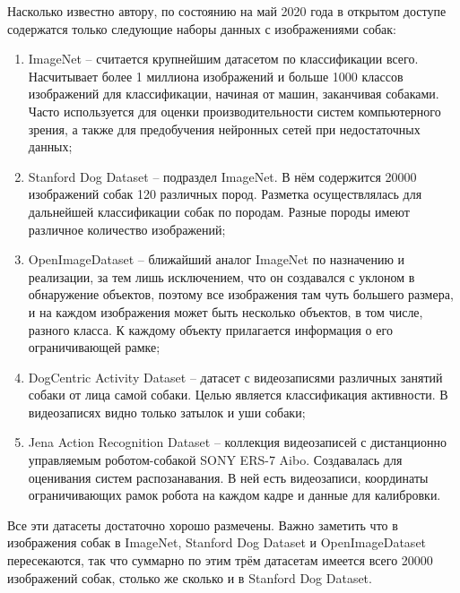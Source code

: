 Насколько известно автору, по состоянию на май 2020 года в открытом доступе содержатся только следующие наборы данных с изображениями собак:
\begin{enumerate}[wide]
  \item ImageNet \cite{imagenet} -- считается крупнейшим датасетом по классификации всего. Насчитывает более 1 миллиона изображений и больше 1000 классов изображений для классификации, начиная от машин, заканчивая собаками. Часто используется для оценки производительности систем компьютерного зрения, а также для предобучения нейронных сетей при недостаточных данных;
  \item Stanford Dog Dataset \cite{KhoslaYaoJayadevaprakashFeiFei_FGVC2011} -- подраздел ImageNet. В нём содержится 20000 изображений собак 120 различных пород. Разметка осуществлялась для дальнейшей классификации собак по породам. Разные породы имеют различное количество изображений;
  \item OpenImageDataset \cite{openimages} -- ближайший аналог ImageNet по назначению и реализации, за тем лишь исключением, что он создавался с уклоном в обнаружение объектов, поэтому все изображения там чуть большего размера, и на каждом изображения может быть несколько объектов, в том числе, разного класса. К каждому объекту прилагается информация о его ограничивающей рамке;
  \item DogCentric Activity Dataset \cite{yumi2014first} -- датасет с видеозаписями различных занятий собаки от лица самой собаки. Целью является классификация активности. В видеозаписях видно только затылок и уши собаки;
  \item Jena Action Recognition Dataset \cite{jena} -- коллекция видеозаписей с дистанционно управляемым роботом-собакой SONY ERS-7 Aibo. Создавалась для оценивания систем распозанавания. В ней есть видеозаписи, координаты ограничивающих рамок робота на каждом кадре и данные для калибровки.
\end{enumerate}
Все эти датасеты достаточно хорошо размечены. Важно заметить что в изображения собак в ImageNet, Stanford Dog Dataset и OpenImageDataset пересекаются, так что суммарно по этим трём датасетам имеется всего 20000 изображений собак, столько же сколько и в Stanford Dog Dataset.